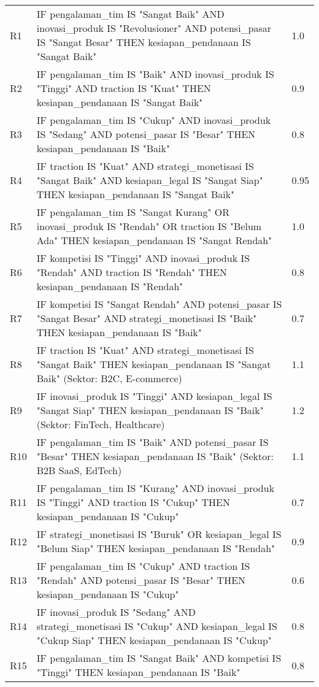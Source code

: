 \documentclass[12pt,a4paper]{article}
\begin{document}
\begin{longtable}{@{} l p{12cm} l @{}}
R1 & IF pengalaman\_tim IS "Sangat Baik" AND inovasi\_produk IS "Revolusioner" AND potensi\_pasar IS "Sangat Besar" THEN kesiapan\_pendanaan IS "Sangat Baik" & 1.0 \\
R2 & IF pengalaman\_tim IS "Baik" AND inovasi\_produk IS "Tinggi" AND traction IS "Kuat" THEN kesiapan\_pendanaan IS "Sangat Baik" & 0.9 \\
R3 & IF pengalaman\_tim IS "Cukup" AND inovasi\_produk IS "Sedang" AND potensi\_pasar IS "Besar" THEN kesiapan\_pendanaan IS "Baik" & 0.8 \\
R4 & IF traction IS "Kuat" AND strategi\_monetisasi IS "Sangat Baik" AND kesiapan\_legal IS "Sangat Siap" THEN kesiapan\_pendanaan IS "Sangat Baik" & 0.95 \\
R5 & IF pengalaman\_tim IS "Sangat Kurang" OR inovasi\_produk IS "Rendah" OR traction IS "Belum Ada" THEN kesiapan\_pendanaan IS "Sangat Rendah" & 1.0 \\
R6 & IF kompetisi IS "Tinggi" AND inovasi\_produk IS "Rendah" AND traction IS "Rendah" THEN kesiapan\_pendanaan IS "Rendah" & 0.8 \\
R7 & IF kompetisi IS "Sangat Rendah" AND potensi\_pasar IS "Sangat Besar" AND strategi\_monetisasi IS "Baik" THEN kesiapan\_pendanaan IS "Baik" & 0.7 \\
R8 & IF traction IS "Kuat" AND strategi\_monetisasi IS "Sangat Baik" THEN kesiapan\_pendanaan IS "Sangat Baik" (Sektor: B2C, E-commerce) & 1.1 \\
R9 & IF inovasi\_produk IS "Tinggi" AND kesiapan\_legal IS "Sangat Siap" THEN kesiapan\_pendanaan IS "Baik" (Sektor: FinTech, Healthcare) & 1.2 \\
R10 & IF pengalaman\_tim IS "Baik" AND potensi\_pasar IS "Besar" THEN kesiapan\_pendanaan IS "Baik" (Sektor: B2B SaaS, EdTech) & 1.1 \\
R11 & IF pengalaman\_tim IS "Kurang" AND inovasi\_produk IS "Tinggi" AND traction IS "Cukup" THEN kesiapan\_pendanaan IS "Cukup" & 0.7 \\
R12 & IF strategi\_monetisasi IS "Buruk" OR kesiapan\_legal IS "Belum Siap" THEN kesiapan\_pendanaan IS "Rendah" & 0.9 \\
R13 & IF pengalaman\_tim IS "Cukup" AND traction IS "Rendah" AND potensi\_pasar IS "Besar" THEN kesiapan\_pendanaan IS "Cukup" & 0.6 \\
R14 & IF inovasi\_produk IS "Sedang" AND strategi\_monetisasi IS "Cukup" AND kesiapan\_legal IS "Cukup Siap" THEN kesiapan\_pendanaan IS "Cukup" & 0.8 \\
R15 & IF pengalaman\_tim IS "Sangat Baik" AND kompetisi IS "Tinggi" THEN kesiapan\_pendanaan IS "Baik" & 0.8 \\
\end{longtable}
\end{document}

